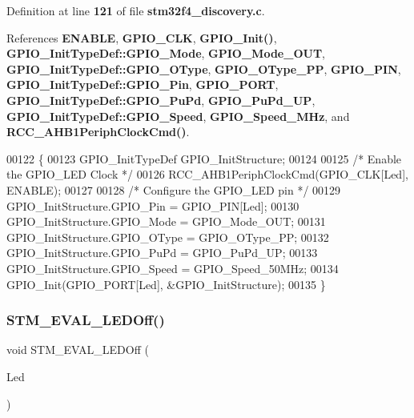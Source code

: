 Definition at line \textbf{ 121} of file \textbf{ stm32f4\+\_\+discovery.\+c}.



References \textbf{ E\+N\+A\+B\+LE}, \textbf{ G\+P\+I\+O\+\_\+\+C\+LK}, \textbf{ G\+P\+I\+O\+\_\+\+Init()}, \textbf{ G\+P\+I\+O\+\_\+\+Init\+Type\+Def\+::\+G\+P\+I\+O\+\_\+\+Mode}, \textbf{ G\+P\+I\+O\+\_\+\+Mode\+\_\+\+O\+UT}, \textbf{ G\+P\+I\+O\+\_\+\+Init\+Type\+Def\+::\+G\+P\+I\+O\+\_\+\+O\+Type}, \textbf{ G\+P\+I\+O\+\_\+\+O\+Type\+\_\+\+PP}, \textbf{ G\+P\+I\+O\+\_\+\+P\+IN}, \textbf{ G\+P\+I\+O\+\_\+\+Init\+Type\+Def\+::\+G\+P\+I\+O\+\_\+\+Pin}, \textbf{ G\+P\+I\+O\+\_\+\+P\+O\+RT}, \textbf{ G\+P\+I\+O\+\_\+\+Init\+Type\+Def\+::\+G\+P\+I\+O\+\_\+\+Pu\+Pd}, \textbf{ G\+P\+I\+O\+\_\+\+Pu\+Pd\+\_\+\+UP}, \textbf{ G\+P\+I\+O\+\_\+\+Init\+Type\+Def\+::\+G\+P\+I\+O\+\_\+\+Speed}, \textbf{ G\+P\+I\+O\+\_\+\+Speed\+\_\+M\+Hz}, and \textbf{ R\+C\+C\+\_\+\+A\+H\+B1\+Periph\+Clock\+Cmd()}.


\begin{DoxyCode}
00122 \{
00123   GPIO_InitTypeDef  GPIO\_InitStructure;
00124   
00125   \textcolor{comment}{/* Enable the GPIO\_LED Clock */}
00126   RCC_AHB1PeriphClockCmd(GPIO_CLK[Led], ENABLE);
00127 
00128   \textcolor{comment}{/* Configure the GPIO\_LED pin */}
00129   GPIO\_InitStructure.GPIO_Pin = GPIO_PIN[Led];
00130   GPIO\_InitStructure.GPIO_Mode = GPIO_Mode_OUT;
00131   GPIO\_InitStructure.GPIO_OType = GPIO_OType_PP;
00132   GPIO\_InitStructure.GPIO_PuPd = GPIO_PuPd_UP;
00133   GPIO\_InitStructure.GPIO_Speed = GPIO_Speed_50MHz;
00134   GPIO_Init(GPIO_PORT[Led], &GPIO\_InitStructure);
00135 \}
\end{DoxyCode}
\mbox{\label{group__STM32F4__DISCOVERY__LOW__LEVEL__Exported__Functions_gab9ab7deafd606e72d72580ec974b7757}} 
\subsubsection{S\+T\+M\+\_\+\+E\+V\+A\+L\+\_\+\+L\+E\+D\+Off()}
{\footnotesize\ttfamily void S\+T\+M\+\_\+\+E\+V\+A\+L\+\_\+\+L\+E\+D\+Off (\begin{DoxyParamCaption}\item[{\textbf{ Led\+\_\+\+Type\+Def}}]{Led }\end{DoxyParamCaption})}



